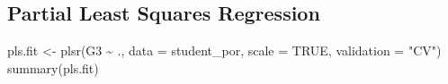 \documentclass[
]{article}
\newenvironment{Shaded}{\begin{snugshade}}{\end{snugshade}}
\newcommand{\AttributeTok}[1]{\textcolor[rgb]{0.77,0.63,0.00}{#1}}
\newcommand{\ConstantTok}[1]{\textcolor[rgb]{0.00,0.00,0.00}{#1}}
\newcommand{\FunctionTok}[1]{\textcolor[rgb]{0.00,0.00,0.00}{#1}}
\newcommand{\NormalTok}[1]{#1}
\newcommand{\OtherTok}[1]{\textcolor[rgb]{0.56,0.35,0.01}{#1}}
\newcommand{\SpecialCharTok}[1]{\textcolor[rgb]{0.00,0.00,0.00}{#1}}
\newcommand{\StringTok}[1]{\textcolor[rgb]{0.31,0.60,0.02}{#1}}
\begin{document}
\hypertarget{partial-least-squares-regression}{%
\subsection{Partial Least Squares
Regression}\label{partial-least-squares-regression}}

\begin{Shaded}
\begin{Highlighting}[]
\NormalTok{pls.fit }\OtherTok{\textless{}{-}} \FunctionTok{plsr}\NormalTok{(G3 }\SpecialCharTok{\textasciitilde{}}\NormalTok{ ., }\AttributeTok{data =}\NormalTok{ student\_por, }\AttributeTok{scale =} \ConstantTok{TRUE}\NormalTok{, }\AttributeTok{validation =} \StringTok{"CV"}\NormalTok{)}
\FunctionTok{summary}\NormalTok{(pls.fit)}
\end{Highlighting}
\end{Shaded}
\end{document}
